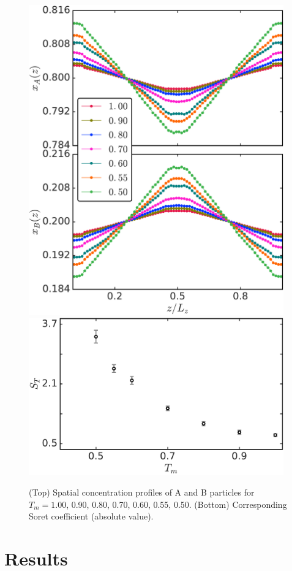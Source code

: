 \begin{figure}[hbt!]
    \centering
	\includegraphics[width=11cm]{figs/fig3p2top.pdf}
	\includegraphics[width=11cm]{figs/fig3p2bottom.pdf}
	\caption[{\em Concentration profiles and Soret coefficeint measured as a function of mean temperature}]{(Top) Spatial concentration profiles of A and B particles for $T_m=1.00$, 0.90, 0.80, 0.70, 0.60, 0.55, 0.50. (Bottom) Corresponding Soret coefficient (absolute value).\label{fig3p2}}
\end{figure}



\section{Results}

